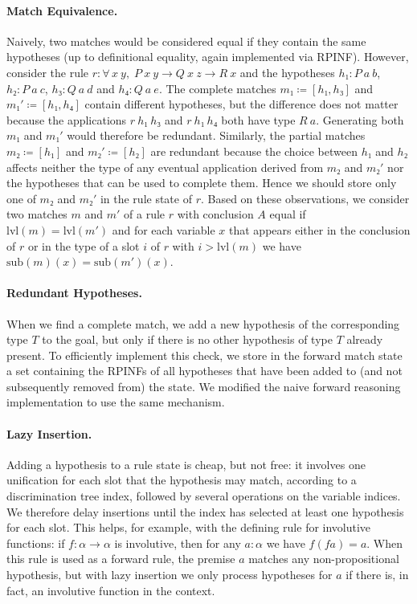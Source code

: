 \documentclass[runningheads,leqno]{llncs}
\newcommand{\All}[2]{\ensuremath{\forall\, #1,\; #2}}
\newcommand{\sub}{\ensuremath{\mathrm{sub}}}
\newcommand{\lvl}{\ensuremath{\mathrm{lvl}}}
\begin{document}
\paragraph{Match Equivalence.}
Naively, two matches would be considered equal if they contain the same hypotheses (up to definitional equality, again implemented via RPINF).
However, consider the rule $r : \All{x~y}{P~x~y → Q~x~z → R~x}$ and the hypotheses $h₁ : P~a~b$, $h₂ : P~a~c$, $h₃ : Q~a~d$ and $h₄ : Q~a~e$.
The complete matches $m₁ ≔ [h₁, h₃]$ and $m₁' ≔ [h₁, h₄]$ contain different hypotheses, but the difference does not matter because the applications $r~h₁~h₃$ and $r~h₁~h₄$ both have type $R~a$.
Generating both $m₁$ and $m₁'$ would therefore be redundant.
Similarly, the partial matches $m₂ ≔ [h₁]$ and $m₂' ≔ [h₂]$ are redundant because the choice between $h₁$ and $h₂$ affects neither the type of any eventual application derived from $m₂$ and $m₂'$ nor the hypotheses that can be used to complete them.
Hence we should store only one of $m₂$ and $m₂'$ in the rule state of $r$.
Based on these observations, we consider two matches $m$ and $m'$ of a rule $r$ with conclusion $A$ equal if $\lvl(m) = \lvl(m')$ and for each variable $x$ that appears either in the conclusion of $r$ or in the type of a slot $i$ of $r$ with $i > \lvl(m)$ we have $\sub(m)(x) = \sub(m')(x)$.

\paragraph{Redundant Hypotheses.}
When we find a complete match, we add a new hypothesis of the corresponding type $T$ to the goal, but only if there is no other hypothesis of type $T$ already present.
To efficiently implement this check, we store in the forward match state a set containing the RPINFs of all hypotheses that have been added to (and not subsequently removed from) the state.
We modified the naive forward reasoning implementation to use the same mechanism.

\paragraph{Lazy Insertion.}
Adding a hypothesis to a rule state is cheap, but not free: it involves one unification for each slot that the hypothesis may match, according to a discrimination tree index, followed by several operations on the variable indices.
We therefore delay insertions until the index has selected at least one hypothesis for each slot.
This helps, for example, with the defining rule for involutive functions: if $f : α → α$ is involutive, then for any $a : α$ we have $f (f a) = a$.
When this rule is used as a forward rule, the premise $a$ matches any non-propositional hypothesis, but with lazy insertion we only process hypotheses for $a$ if there is, in fact, an involutive function in the context.
\end{document}
